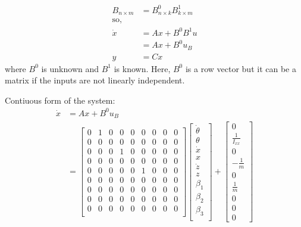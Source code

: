 \documentclass[12pt]{article}
\begin{document}
{\begin{align*}
    B_{n \times m} &= B^{0}_{n \times k} B^{1}_{k \times m} \\ 
    \text{so,}  \\
    \dot{x} &= Ax + B^{0} B^{1} u \\
    &= Ax + B^{0} u_{B} \\
    y &= Cx 
\end{align*}
where $B^{0}$ is unknown and $B^{1}$ is known. Here, $B^{0}$ is a row vector but it can be a matrix if the inputs are not linearly independent.

Contiuous form of the system:
\begin{align*}
    \dot{x} &= Ax + B^{0} u_{B} \\
    &= \begin{bmatrix}
        0 & 1 & 0 & 0 & 0 & 0 & 0 & 0 & 0 \\
        0 & 0 & 0 & 0 & 0 & 0 & 0 & 0 & 0 \\
        0 & 0 & 0 & 1 & 0 & 0 & 0 & 0 & 0 \\
        0 & 0 & 0 & 0 & 0 & 0 & 0 & 0 & 0 \\
        0 & 0 & 0 & 0 & 0 & 1 & 0 & 0 & 0 \\
        0 & 0 & 0 & 0 & 0 & 0 & 0 & 0 & 0 \\
        0 & 0 & 0 & 0 & 0 & 0 & 0 & 0 & 0 \\
        0 & 0 & 0 & 0 & 0 & 0 & 0 & 0 & 0 \\
        0 & 0 & 0 & 0 & 0 & 0 & 0 & 0 & 0 \\
    \end{bmatrix} \begin{bmatrix}
        \dot{\theta} \\
        \theta \\
        \dot{x} \\
        x \\
        \dot{z} \\
        z \\
        \beta_1 \\
        \beta_2 \\
        \beta_3 \\
    \end{bmatrix} + \begin{bmatrix}
        0 \\ \frac{1}{I_{xx}} \\ 0 \\ -\frac{1}{m} \\ 0 \\ \frac{1}{m} \\  0 \\ 0 \\ 0

\end{bmatrix}
\end{align*}}
\end{document}
